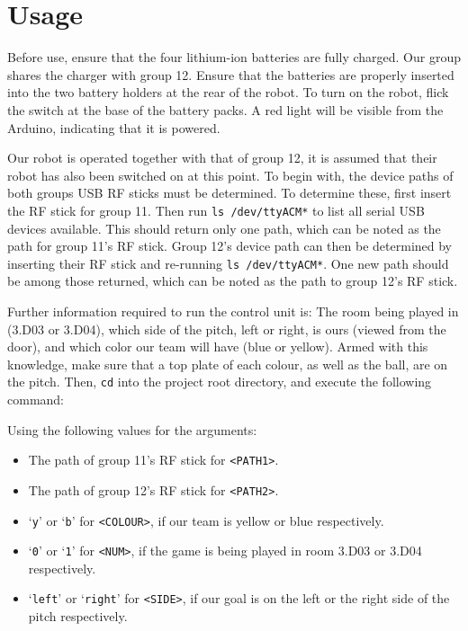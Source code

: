 \section{Usage}

Before use, ensure that the four lithium-ion batteries are fully charged. Our
group shares the charger with group 12. Ensure that the batteries are properly
inserted into the two battery holders at the rear of the robot. To turn on the
robot, flick the switch at the base of the battery packs. A red light will be
visible from the Arduino, indicating that it is powered.

Our robot is operated together with that of group 12, it is assumed that their
robot has also been switched on at this point. To begin with, the device paths
of both groups USB RF sticks must be determined. To determine these, first
insert the RF stick for group 11. Then run \texttt{ls /dev/ttyACM*} to list all
serial USB devices available. This should return only one path, which can be
noted as the path for group 11's RF stick. Group 12's device path can then be
determined by inserting their RF stick and re-running \texttt{ls /dev/ttyACM*}.
One new path should be among those returned, which can be noted as the path to
group 12's RF stick.

Further information required to run the control unit is: The room being played
in (3.D03 or 3.D04), which side of the pitch, left or right, is ours (viewed
from the door), and which color our team will have (blue or yellow). Armed with
this knowledge, make sure that a top plate of each colour, as well as the ball,
are on the pitch. Then, \texttt{cd} into the project root directory, and
execute the following command:


\noindent Using the following values for the arguments:

\begin{itemize}
    \item The path of group 11's RF stick for \texttt{<PATH1>}.
    \item The path of group 12's RF stick for \texttt{<PATH2>}.
    \item `\texttt{y}' or `\texttt{b}' for \texttt{<COLOUR>}, if our team is
        yellow or blue respectively.
    \item `\texttt{0}' or `\texttt{1}' for \texttt{<NUM>}, if the game is being
        played in room 3.D03 or 3.D04 respectively.
    \item `\texttt{left}' or `\texttt{right}' for \texttt{<SIDE>}, if our goal
        is on the left or the right side of the pitch respectively.
\end{itemize}

